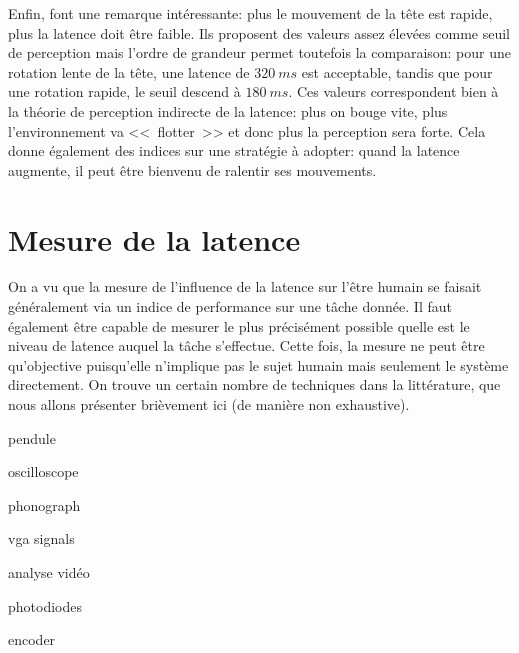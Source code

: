 	\par Enfin, \citep{allison_tolerance_2001} font une remarque intéressante: plus le mouvement de la tête est rapide, plus la latence doit être faible. Ils proposent des valeurs assez élevées comme seuil de perception mais l'ordre de grandeur permet toutefois la comparaison: pour une rotation lente de la tête, une latence de $320~ms$ est acceptable, tandis que pour une rotation rapide, le seuil descend à $180~ms$. Ces valeurs correspondent bien à la théorie de perception indirecte de la latence: plus on bouge vite, plus l'environnement va <<~flotter~>> et donc plus la perception sera forte. Cela donne également des indices sur une stratégie à adopter: quand la latence augmente, il peut être bienvenu de ralentir ses mouvements.
	
	\section{Mesure de la latence}
	\par On a vu que la mesure de l'influence de la latence sur l'être humain se faisait généralement via un indice de performance sur une tâche donnée. Il faut également être capable de mesurer le plus précisément possible quelle est le niveau de latence auquel la tâche s'effectue. Cette fois, la mesure ne peut être qu'objective puisqu'elle n'implique pas le sujet humain mais seulement le système directement. On trouve un certain nombre de techniques dans la littérature, que nous allons présenter brièvement ici (de manière non exhaustive).
	
	\par pendule \citep{liang_temporal-spatial_1991}
	
	\par oscilloscope \citep{jacoby_improved_1996}
	
	\par phonograph \citep{swindells_system_2000}
	
	\par vga signals \citep{ellis_generalizeability_2004}
	
	\par analyse vidéo \citep{steed_simple_2008}
	
	\par photodiodes \citep{di_luca_new_2010}
	
	\par encoder \citep{papadakis_system_2011}
	
